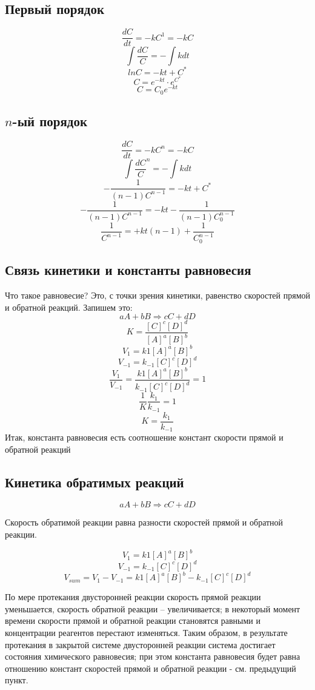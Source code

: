 \documentclass[14pt,a4paper]{scrartcl}
\begin{document}
\subsection*{Первый порядок}
$$\frac{dC}{dt} = -kC^1 = -kC$$
$$\int \frac{dC}C = -\int kdt$$
$$ln C = -kt + C^*$$
$$C = e^{-kt}\cdot e^{C^*}$$
$$C = C_0e^{-kt}$$

\subsection*{$n$-ый порядок}
$$\frac{dC}{dt} = -kC^n = -kC$$
$$\int \frac{dC}C^n = -\int kdt$$
$$-\frac{1}{(n-1)C^{n-1}} = -kt + C^*$$
$$-\frac{1}{(n-1)C^{n-1}} = -kt - \frac{1}{(n-1)C_0^{n-1}}$$
$$ \frac 1{C^{n-1}} = +kt(n-1) + \frac1{C_0^{n-1}}$$

\subsection*{Связь кинетики и константы равновесия}

Что такое равновесие? Это, с точки зрения кинетики, равенство скоростей прямой и обратной реакций. Запишем это:
$$aA + bB \Rightarrow cC + dD$$
$$K =\frac{\left[C\right]^c\left[D\right]^d}{\left[A\right]^a\left[B\right]^b}$$
$$V_1 = k1 \left[A\right]^a\left[B\right]^b$$
$$V_{-1} = k_{-1}\left[C\right]^c\left[D\right]^d$$
$$\frac{V_1}{V_{-1}} = \frac{k1 \left[A\right]^a\left[B\right]^b}{k_{-1}\left[C\right]^c\left[D\right]^d} = 1$$
$$\frac 1K\frac{k_1}{k_{-1}} = 1$$
$$K = \frac{k_1}{k_{-1}}$$
Итак, константа равновесия есть соотношение констант скорости прямой и обратной реакций

\subsection*{Кинетика обратимых реакций}

$$aA + bB \Rightarrow cC + dD$$

Скорость обратимой реакции равна разности скоростей прямой и обратной реакции.

$$V_1 = k1 \left[A\right]^a\left[B\right]^b$$
$$V_{-1} = k_{-1}\left[C\right]^c\left[D\right]^d$$
$$V_{sum} = V_1 - V_{-1} = k1 \left[A\right]^a\left[B\right]^b - k_{-1}\left[C\right]^c\left[D\right]^d$$

По мере протекания двусторонней реакции скорость прямой реакции уменьшается, скорость обратной реакции – увеличивается; в некоторый момент времени скорости прямой и обратной реакции становятся равными и концентрации реагентов перестают изменяться. Таким образом, в результате протекания в закрытой системе двусторонней реакции система достигает состояния химического равновесия; при этом константа равновесия будет равна отношению констант скоростей прямой и обратной реакции - см. предыдущий пункт.
\end{document}
